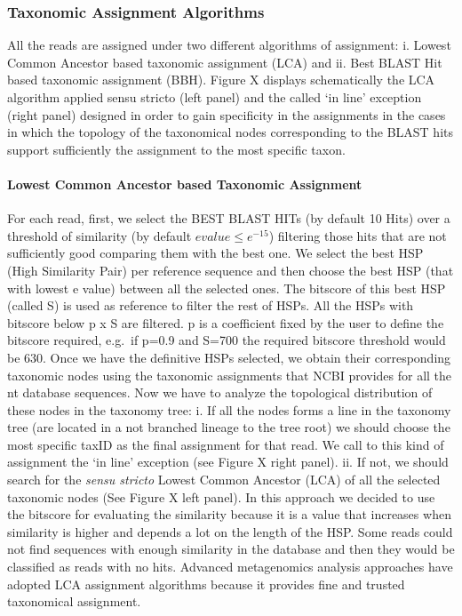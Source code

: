 \documentclass{frontiersSCNS} %
\begin{document}
\subsubsection{Taxonomic Assignment
Algorithms}\label{taxonomic-assignment-algorithms}

All the reads are assigned under two different algorithms of assignment:
i. Lowest Common Ancestor based taxonomic assignment (LCA) and ii. Best
BLAST Hit based taxonomic assignment (BBH). Figure X displays
schematically the LCA algorithm applied sensu stricto (left panel) and
the called `in line' exception (right panel) designed in order to gain
specificity in the assignments in the cases in which the topology of the
taxonomical nodes corresponding to the BLAST hits support sufficiently
the assignment to the most specific taxon.

\paragraph{Lowest Common Ancestor based Taxonomic
Assignment}\label{lowest-common-ancestor-based-taxonomic-assignment}

For each read, first, we select the BEST BLAST HITs (by default 10 Hits)
over a threshold of similarity (by default \(evalue \leq e^{-15}\))
filtering those hits that are not sufficiently good comparing them with
the best one. We select the best HSP (High Similarity Pair) per
reference sequence and then choose the best HSP (that with lowest e
value) between all the selected ones. The bitscore of this best HSP
(called S) is used as reference to filter the rest of HSPs. All the HSPs
with bitscore below p x S are filtered. p is a coefficient fixed by the
user to define the bitscore required, e.g.~if p=0.9 and S=700 the
required bitscore threshold would be 630. Once we have the definitive
HSPs selected, we obtain their corresponding taxonomic nodes using the
taxonomic assignments that NCBI provides for all the nt database
sequences. Now we have to analyze the topological distribution of these
nodes in the taxonomy tree: i. If all the nodes forms a line in the
taxonomy tree (are located in a not branched lineage to the tree root)
we should choose the most specific taxID as the final assignment for
that read. We call to this kind of assignment the `in line' exception
(see Figure X right panel). ii. If not, we should search for the
\emph{sensu stricto} Lowest Common Ancestor (LCA) of all the selected
taxonomic nodes (See Figure X left panel). In this approach we decided
to use the bitscore for evaluating the similarity because it is a value
that increases when similarity is higher and depends a lot on the length
of the HSP. Some reads could not find sequences with enough similarity
in the database and then they would be classified as reads with no hits.
Advanced metagenomics analysis approaches \citep{huson2013microbial}
have adopted LCA assignment algorithms because it provides fine and
trusted taxonomical assignment.
\end{document}
